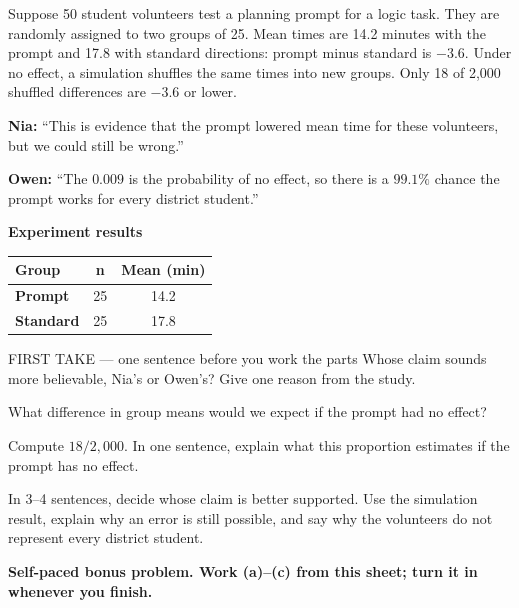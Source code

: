 \documentclass[14pt]{extarticle}
\begin{document}
\pagestyle{empty}


\noindent\begin{minipage}[t]{0.57\linewidth}
\vspace{0pt}
Suppose 50 student volunteers test a planning prompt for a logic task. They are randomly assigned to two groups of 25. Mean times are 14.2 minutes with the prompt and 17.8 with standard directions: prompt minus standard is $-3.6$. Under no effect, a simulation shuffles the same times into new groups. Only 18 of 2{,}000 shuffled differences are $-3.6$ or lower.\par\smallskip \textbf{Nia:} ``This is evidence that the prompt lowered mean time for these volunteers, but we could still be wrong.''\par \textbf{Owen:} ``The $0.009$ is the probability of no effect, so there is a $99.1\%$ chance the prompt works for every district student.''\par
\end{minipage}\hfill
\begin{minipage}[t]{0.40\linewidth}
\vspace{0pt}
\begin{center}
\textbf{Experiment results}\par\smallskip
\begin{tabular}{|l|c|c|}
\hline
\textbf{Group} & \textbf{n} & \textbf{Mean (min)} \\ \hline
\textbf{Prompt} & 25 & 14.2 \\ \hline
\textbf{Standard} & 25 & 17.8 \\ \hline
\end{tabular}
\end{center}
\end{minipage}

\begin{firsttakebox}{FIRST TAKE --- one sentence before you work the parts}
Whose claim sounds more believable, Nia's or Owen's? Give one reason from the study.
\end{firsttakebox}

\begin{description}[leftmargin=1.15in, labelwidth=1in, itemsep=2pt, topsep=2pt]
  \item[\dokbadge{1}~(a)] What difference in group means would we expect if the prompt had no effect?
  \item[\dokbadge{2}~(b)] Compute $18/2{,}000$. In one sentence, explain what this proportion estimates if the prompt has no effect.
  \item[\dokbadge{3}~(c)] In 3--4 sentences, decide whose claim is better supported. Use the simulation result, explain why an error is still possible, and say why the volunteers do not represent every district student.
\end{description}

\vfill
\textbf{Self-paced bonus problem. Work (a)--(c) from this sheet; turn it in whenever you finish.}
\end{document}
